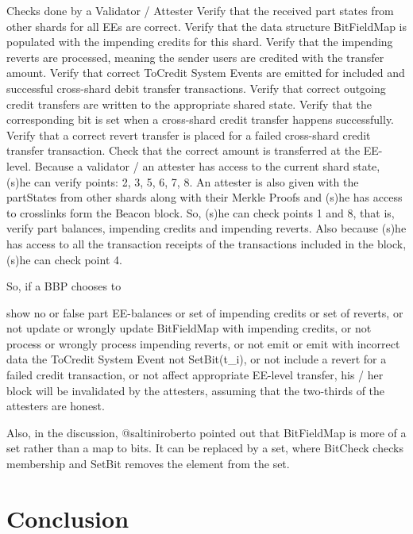 \documentclass{article}
\begin{document}
Checks done by a Validator / Attester
Verify that the received part states from other shards for all EEs are correct.
Verify that the data structure BitFieldMap is populated with the impending credits for this shard.
Verify that the impending reverts are processed, meaning the sender users are credited with the transfer amount.
Verify that correct ToCredit System Events are emitted for included and successful cross-shard debit transfer transactions.
Verify that correct outgoing credit transfers are written to the appropriate shared state.
Verify that the corresponding bit is set when a cross-shard credit transfer happens successfully.
Verify that a correct revert transfer is placed for a failed cross-shard credit transfer transaction.
Check that the correct amount is transferred at the EE-level.
Because a validator / an attester has access to the current shard state, (s)he can verify points: 2, 3, 5, 6, 7, 8. An attester is also given with the partStates from other shards along with their Merkle Proofs and (s)he has access to crosslinks form the Beacon block. So, (s)he can check points 1 and 8, that is, verify part balances, impending credits and impending reverts. Also because (s)he has access to all the transaction receipts of the transactions included in the block, (s)he can check point 4.

So, if a BBP chooses to

show no or false
part EE-balances or
set of impending credits or
set of reverts, or
not update or wrongly update BitFieldMap with impending credits, or
not process or wrongly process impending reverts, or
not emit or emit with incorrect data the ToCredit System Event
not SetBit(t_i), or
not include a revert for a failed credit transaction, or
not affect appropriate EE-level transfer,
his / her block will be invalidated by the attesters, assuming that the two-thirds of the attesters are honest.

Also, in the discussion, @saltiniroberto pointed out that BitFieldMap is more of a set rather than a map to bits. It can be replaced by a set, where BitCheck checks membership and SetBit removes the element from the set.

\section{Conclusion}



\end{document}
